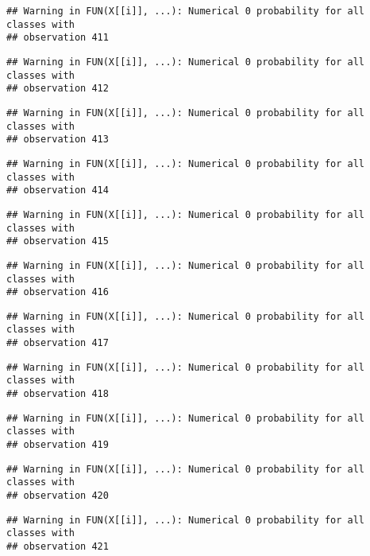 \documentclass[
]{article}
\begin{document}
\begin{verbatim}
## Warning in FUN(X[[i]], ...): Numerical 0 probability for all classes with
## observation 411
\end{verbatim}

\begin{verbatim}
## Warning in FUN(X[[i]], ...): Numerical 0 probability for all classes with
## observation 412
\end{verbatim}

\begin{verbatim}
## Warning in FUN(X[[i]], ...): Numerical 0 probability for all classes with
## observation 413
\end{verbatim}

\begin{verbatim}
## Warning in FUN(X[[i]], ...): Numerical 0 probability for all classes with
## observation 414
\end{verbatim}

\begin{verbatim}
## Warning in FUN(X[[i]], ...): Numerical 0 probability for all classes with
## observation 415
\end{verbatim}

\begin{verbatim}
## Warning in FUN(X[[i]], ...): Numerical 0 probability for all classes with
## observation 416
\end{verbatim}

\begin{verbatim}
## Warning in FUN(X[[i]], ...): Numerical 0 probability for all classes with
## observation 417
\end{verbatim}

\begin{verbatim}
## Warning in FUN(X[[i]], ...): Numerical 0 probability for all classes with
## observation 418
\end{verbatim}

\begin{verbatim}
## Warning in FUN(X[[i]], ...): Numerical 0 probability for all classes with
## observation 419
\end{verbatim}

\begin{verbatim}
## Warning in FUN(X[[i]], ...): Numerical 0 probability for all classes with
## observation 420
\end{verbatim}

\begin{verbatim}
## Warning in FUN(X[[i]], ...): Numerical 0 probability for all classes with
## observation 421
\end{verbatim}
\end{document}
